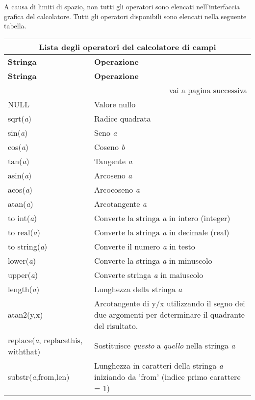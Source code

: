 A causa di limiti di spazio, non tutti gli operatori sono elencati nell'interfaccia grafica del calcolatore. 
Tutti gli operatori disponibili sono elencati nella seguente tabella.

\begin{center}
{\setlength{\extrarowheight}{10pt}
\small
\begin{longtable}{|p{4cm}|p{10cm}|}
\hline \multicolumn{2}{|c|}{\textbf{Lista degli operatori del calcolatore di campi}}\\
\hline \textbf{Stringa}&\textbf{Operazione}\\
\endfirsthead
\hline \textbf{Stringa}&\textbf{Operazione}\\
\endhead
\hline \multicolumn{2}{|r|}{{vai a pagina successiva}} \\ \hline
\endfoot
\endlastfoot
\hline NULL & Valore nullo \\
\hline sqrt(\textit{a}) & Radice quadrata \\
\hline sin(\textit{a}) & Seno \textit{a} \\
\hline cos(\textit{a}) & Coseno \textit{b} \\
\hline tan(\textit{a}) & Tangente \textit{a} \\
\hline asin(\textit{a}) & Arcoseno \textit{a} \\
\hline acos(\textit{a}) & Arcocoseno \textit{a} \\
\hline atan(\textit{a}) & Arcotangente \textit{a} \\
\hline to int(\textit{a}) & Converte la stringa \textit{a} in intero (integer) \\
\hline to real(\textit{a}) & Converte la stringa \textit{a} in decimale (real) \\
\hline to string(\textit{a}) & Converte il numero \textit{a} in testo \\
\hline lower(\textit{a}) & Converte la stringa \textit{a} in minuscolo \\
\hline upper(\textit{a}) & Converte stringa \textit{a} in maiuscolo \\
\hline length(\textit{a}) & Lunghezza della stringa \textit{a} \\
\hline atan2(y,x) & Arcotangente di y/x utilizzando il segno dei due argomenti per determinare il quadrante del risultato. \\
\hline replace(\textit{a}, replacethis, withthat) & Sostituisce \textit{questo} a \textit{quello} nella stringa \textit{a} \\
\hline substr(\textit{a},from,len) & Lunghezza in caratteri della stringa \textit{a} iniziando da 'from' (indice primo carattere = 1) \\

\end{longtable}}
\end{center}
